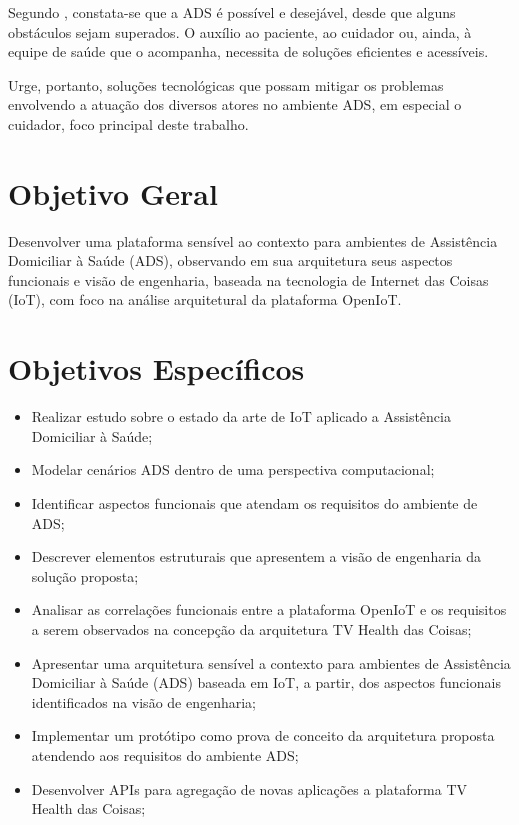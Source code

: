 Segundo , constata-se que a ADS é possível e desejável,
desde que alguns obstáculos sejam superados.  O auxílio ao paciente, ao
cuidador ou, ainda, à equipe de saúde que o acompanha, necessita de soluções
eficientes e acessíveis.

Urge, portanto, soluções tecnológicas que possam mitigar os problemas envolvendo
a atuação dos diversos atores no ambiente ADS, em especial o cuidador,
foco principal deste trabalho.

\section{Objetivo Geral}\label{sec:objetivos}

Desenvolver uma plataforma sensível ao contexto para ambientes de Assistência
Domiciliar à Saúde (ADS), observando em sua arquitetura seus aspectos
funcionais e visão de engenharia, baseada na tecnologia de Internet das Coisas
(IoT), com foco na análise arquitetural da plataforma OpenIoT.

\section{Objetivos Específicos}

\begin{itemize}
  \item Realizar estudo sobre o estado da arte de IoT aplicado a Assistência
    Domiciliar à Saúde;
  \item Modelar cenários ADS dentro de uma perspectiva computacional;
  \item Identificar aspectos funcionais que atendam os requisitos do ambiente
    de ADS;
  \item Descrever elementos estruturais que apresentem a visão de engenharia da
    solução proposta;
  \item Analisar as correlações funcionais entre a plataforma OpenIoT e os
    requisitos a serem observados na concepção da arquitetura TV Health das
    Coisas;
  \item Apresentar uma arquitetura sensível a contexto para ambientes de
    Assistência Domiciliar à Saúde (ADS) baseada em IoT, a partir, dos aspectos
    funcionais identificados na visão de engenharia;
  \item Implementar um protótipo como prova de conceito da arquitetura proposta
    atendendo aos requisitos do ambiente ADS;
  \item Desenvolver APIs para agregação de novas aplicações a plataforma TV
    Health das Coisas;
\end{itemize}

